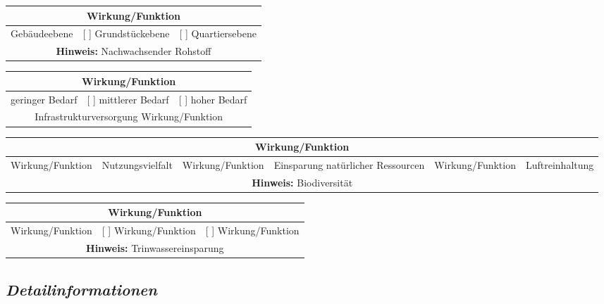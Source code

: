 \documentclass[
]{article}
\begin{document}
\begin{center}
\begin{tabularx}{\textwidth}{|X|X|X|}
\hline
\multicolumn{3}{|c|}{\textbf{Wirkung/Funktion}} \tabularnewline
\hline
[ ] Gebäudeebene & [ ] Grundstückebene & [ ] Quartiersebene \\
\hline
\multicolumn{3}{|c|}{\textbf{Hinweis:} Nachwachsender Rohstoff} \\
\hline
\end{tabularx}
\end{center}

\begin{center}
\begin{tabular}{|c|c|c|}
\hline
\multicolumn{3}{|c|}{\textbf{Wirkung/Funktion}} \tabularnewline
\hline
[ ] geringer Bedarf & [ ] mittlerer Bedarf & [ ] hoher Bedarf \\
\hline
\multicolumn{3}{|c|}{Infrastrukturversorgung   Wirkung/Funktion} \\
\hline
\end{tabular}
\end{center}

\begin{center}
\begin{tabular}{|c|c|c|c|c|c|}
\hline
\multicolumn{6}{|c|}{\textbf{Wirkung/Funktion}} \tabularnewline
\hline
Wirkung/Funktion & Nutzungsvielfalt  &Wirkung/Funktion & Einsparung natürlicher Ressourcen  & Wirkung/Funktion & Luftreinhaltung \\
\hline
\multicolumn{6}{|c|}{\textbf{Hinweis:} Biodiversität} \\
\hline
\end{tabular}
\end{center}

\begin{center}
\begin{tabular}{|c|c|c|}
\hline
\multicolumn{3}{|c|}{\textbf{Wirkung/Funktion}} \\
\hline
[ ]Wirkung/Funktion & [ ] Wirkung/Funktion  & [ ] Wirkung/Funktion \\
\hline
\multicolumn{3}{|c|}{\textbf{Hinweis:} Trinwassereinsparung} \\
\hline
\end{tabular}
\end{center}

\hypertarget{detailinformationen}{%
\subsection{\texorpdfstring{\emph{Detailinformationen}}{Detailinformationen}}\label{detailinformationen}}
\end{document}
